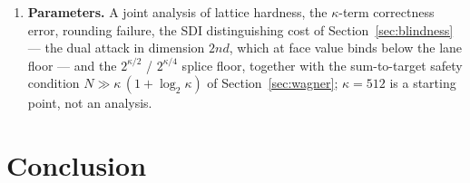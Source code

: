 \documentclass[11pt]{article}
\begin{document}
\begin{enumerate}
carries the dishonest-signer blindness proof through: every hop is proven
except short-decomposition indistinguishability (Game~\ref{game:sdi}),
which is necessary as well as sufficient.  What remains is a reduction of
SDI to a standard decision-MLWE instance (robustness bookkeeping for the
width-$w$ sum distributions), its concrete costing against the dual
distinguishing attack --- at face value below the lane floor, and so
possibly the binding constraint of the whole construction --- its quantum
analogue, and enforcement of the operational conventions (KV), (SID),
(ABORT).
 \item \textbf{Parameters.}  A joint analysis of lattice hardness, the
$\kappa$-term correctness error, rounding failure, the SDI distinguishing
cost of Section~\ref{sec:blindness} --- the dual attack in dimension $2nd$,
which at face value binds below the lane floor --- and the $2^{\kappa/2}$ /
$2^{\kappa/4}$ splice floor, together with the sum-to-target safety condition
$N\gg\kappa\,(1+\log_2\kappa)$ of Section~\ref{sec:wagner};
$\kappa=512$ is a starting point, not an analysis.
\end{enumerate}

\section{Conclusion}
\end{document}
